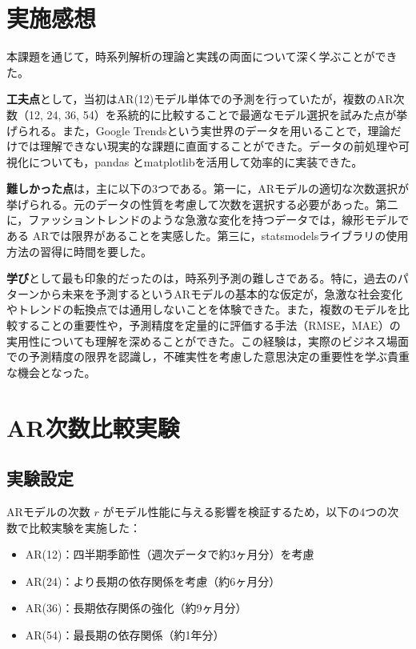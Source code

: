 \documentclass[12pt]{article}
\begin{document}
\section{実施感想}

本課題を通じて，時系列解析の理論と実践の両面について深く学ぶことができた。

\textbf{工夫点}として，当初はAR(12)モデル単体での予測を行っていたが，複数のAR次数（12, 24, 36, 54）を系統的に比較することで最適なモデル選択を試みた点が挙げられる。また，Google Trendsという実世界のデータを用いることで，理論だけでは理解できない現実的な課題に直面することができた。データの前処理や可視化についても，pandas とmatplotlibを活用して効率的に実装できた。

\textbf{難しかった点}は，主に以下の3つである。第一に，ARモデルの適切な次数選択が挙げられる。元のデータの性質を考慮して次数を選択する必要があった。第二に，ファッショントレンドのような急激な変化を持つデータでは，線形モデルである ARでは限界があることを実感した。第三に，statsmodelsライブラリの使用方法の習得に時間を要した。

\textbf{学び}として最も印象的だったのは，時系列予測の難しさである。特に，過去のパターンから未来を予測するというARモデルの基本的な仮定が，急激な社会変化やトレンドの転換点では通用しないことを体験できた。また，複数のモデルを比較することの重要性や，予測精度を定量的に評価する手法（RMSE，MAE）の実用性についても理解を深めることができた。この経験は，実際のビジネス場面での予測精度の限界を認識し，不確実性を考慮した意思決定の重要性を学ぶ貴重な機会となった。

\section{AR次数比較実験}

\subsection{実験設定}
ARモデルの次数 $r$ がモデル性能に与える影響を検証するため，以下の4つの次数で比較実験を実施した：
\begin{itemize}
\item AR(12)：四半期季節性（週次データで約3ヶ月分）を考慮
\item AR(24)：より長期の依存関係を考慮（約6ヶ月分）
\item AR(36)：長期依存関係の強化（約9ヶ月分）
\item AR(54)：最長期の依存関係（約1年分）
\end{itemize}
\end{document}
